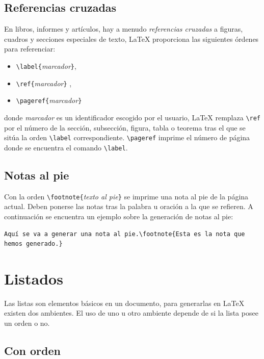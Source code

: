 \documentclass[a4,10pt]{aleph-notas}
\begin{document}
  \subsection{Referencias cruzadas}

En libros, informes y artículos, hay a menudo \emph{referencias cruzadas} a figuras, cuadros y secciones especiales de texto, \LaTeX{} proporciona las siguientes órdenes para referenciar:
 \begin{itemize}
  \item \verb|\label{|\emph{marcador}\verb|}|,
  \item \verb|\ref{|\emph{marcador}\verb|}| ,
  \item \verb|\pageref{|\emph{marcador}\verb|}|
 \end{itemize}
donde \emph{marcador} es un identificador escogido por el usuario, \LaTeX{} remplaza \verb|\ref| por el número de la sección, subsección, figura, tabla o teorema tras el que se sitúa la orden \verb|\label| correspondiente. \verb|\pageref| imprime el número de página donde se encuentra el comando \verb|\label|.

  \subsection{Notas al pie}

Con la orden \verb|\footnote{|\emph{texto al pie}\verb|}| se imprime una nota al pie de la página actual.  Deben ponerse las notas tras la palabra u oración a la que se refieren. A continuación se encuentra un ejemplo sobre la generación de notas al pie:

\begin{lstlisting}[frame=single]
Aquí se va a generar una nota al pie.\footnote{Esta es la nota que hemos generado.}
\end{lstlisting}

\section{Listados}

Las listas son elementos básicos en un documento, para generarlas en \LaTeX \hspace{1.5pt} existen dos ambientes. El uso de uno u otro ambiente depende de si la lista posee un orden o no.

\subsection{Con orden}
\end{document}
